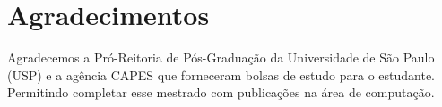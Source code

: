 \documentclass[10pt,letterpaper]{article}
\begin{document}


\section*{Agradecimentos}
Agradecemos a Pró-Reitoria de Pós-Graduação da Universidade de São Paulo (USP) e a agência CAPES que forneceram bolsas de estudo para o estudante. Permitindo completar esse mestrado com publicações na área de computação.

\nolinenumbers

%
%
% 
\end{document}
